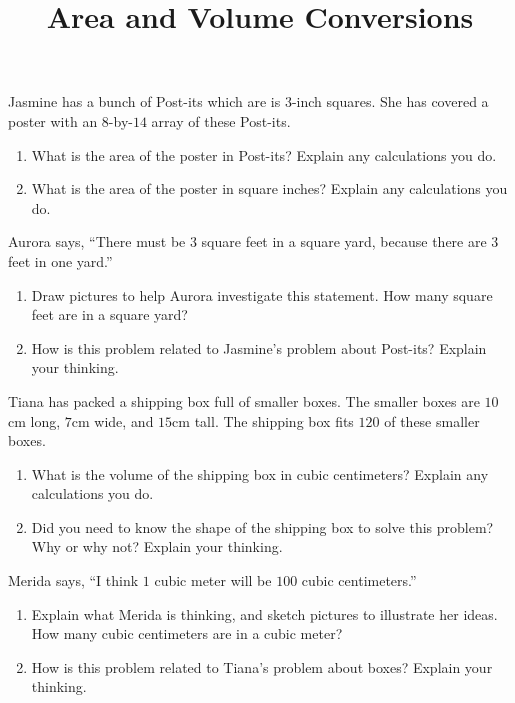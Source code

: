 \documentclass[nooutcomes,noauthor, handout]{ximera}
\title{Area and Volume Conversions}
\begin{document}
\begin{abstract}\end{abstract}
\maketitle



\begin{problem}
	Jasmine has a bunch of Post-its which are is $3$-inch squares. She has covered a poster with an $8$-by-$14$ array of these Post-its. 
	\begin{enumerate}
		\item What is the area of the poster in Post-its? Explain any calculations you do.
		\item What is the area of the poster in square inches? Explain any calculations you do.
	\end{enumerate}
\end{problem}



\begin{problem}
Aurora says, ``There must be $3$ square feet in a square yard, because there are $3$ feet in one yard.''

\begin{enumerate}
	\item Draw pictures to help Aurora investigate this statement. How many square feet are in a square yard?
	\item How is this problem related to Jasmine's problem about Post-its? Explain your thinking.
\end{enumerate}
\end{problem}



\begin{problem}
Tiana has packed a shipping box full of smaller boxes. The smaller boxes are $10$cm long, $7$cm wide, and $15$cm tall. The shipping box fits $120$ of these smaller boxes.
\begin{enumerate}
	\item What is the volume of the shipping box in cubic centimeters? Explain any calculations you do.
	\item Did you need to know the shape of the shipping box to solve this problem? Why or why not? Explain your thinking.
\end{enumerate}
\end{problem}



\begin{problem}
Merida says, ``I think $1$ cubic meter will be $100$ cubic centimeters.''

\begin{enumerate}
	\item Explain what Merida is thinking, and sketch pictures to illustrate her ideas. How many cubic centimeters are in a cubic meter?
	\item How is this problem related to Tiana's problem about boxes? Explain your thinking.
\end{enumerate}
\end{problem}
\end{document}
